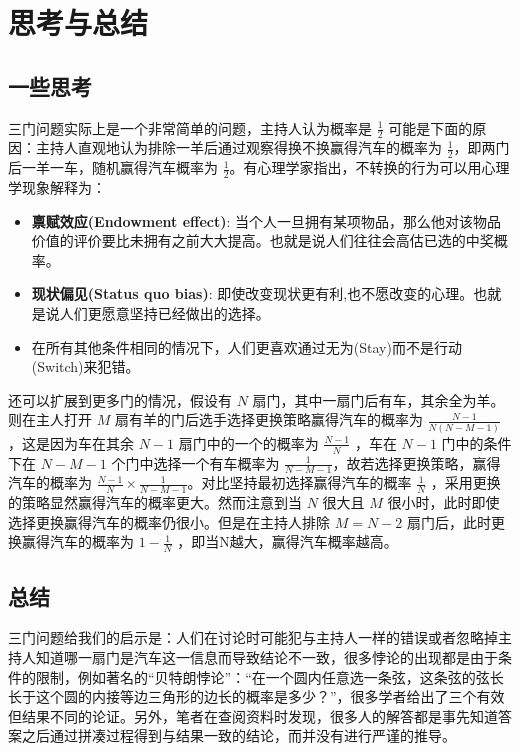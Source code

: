 \section{思考与总结}

\subsection{一些思考}

三门问题实际上是一个非常简单的问题，主持人认为概率是 $\frac{1}{2}$ 可能是下面的原因：主持人直观地认为排除一羊后通过观察得换不换赢得汽车的概率为 $\frac{1}{2}$，即两门后一羊一车，随机赢得汽车概率为 $\frac{1}{2}$。有心理学家指出，不转换的行为可以用心理学现象解释为：

\begin{itemize}
	\item \textbf{禀赋效应(Endowment effect)}: 当个人一旦拥有某项物品，那么他对该物品价值的评价要比未拥有之前大大提高。也就是说人们往往会高估已选的中奖概率。 
	\item \textbf{现状偏见(Status quo bias)}: 即使改变现状更有利,也不愿改变的心理。也就是说人们更愿意坚持已经做出的选择。
	\item 在所有其他条件相同的情况下，人们更喜欢通过无为(Stay)而不是行动(Switch)来犯错。
\end{itemize}

还可以扩展到更多门的情况，假设有 $N$ 扇门，其中一扇门后有车，其余全为羊。则在主人打开 $M$ 扇有羊的门后选手选择更换策略赢得汽车的概率为 $\frac{N-1}{N(N-M-1)}$ ，这是因为车在其余 $N-1$ 扇门中的一个的概率为 $\frac{N-1}{N}$ ，车在 $N-1$ 门中的条件下在 $N-M-1$ 个门中选择一个有车概率为 $\frac{1}{N-M-1}$，故若选择更换策略，赢得汽车的概率为 $\frac{N-1}{N}\times \frac{1}{N-M-1}$。对比坚持最初选择赢得汽车的概率 $\frac{1}{N}$ ，采用更换的策略显然赢得汽车的概率更大。然而注意到当 $N$ 很大且 $M$ 很小时，此时即使选择更换赢得汽车的概率仍很小。但是在主持人排除 $M=N-2$ 扇门后，此时更换赢得汽车的概率为 $1-\frac{1}{N}$ ，即当N越大，赢得汽车概率越高。

\subsection{总结}

三门问题给我们的启示是：人们在讨论时可能犯与主持人一样的错误或者忽略掉主持人知道哪一扇门是汽车这一信息而导致结论不一致，很多悖论的出现都是由于条件的限制，例如著名的“贝特朗悖论”\cite{杨培恒1990关于贝特朗奇论的讨论}：“在一个圆内任意选一条弦，这条弦的弦长长于这个圆的内接等边三角形的边长的概率是多少？”，很多学者给出了三个有效但结果不同的论证。另外，笔者在查阅资料时发现，很多人的解答都是事先知道答案之后通过拼凑过程得到与结果一致的结论，而并没有进行严谨的推导。


